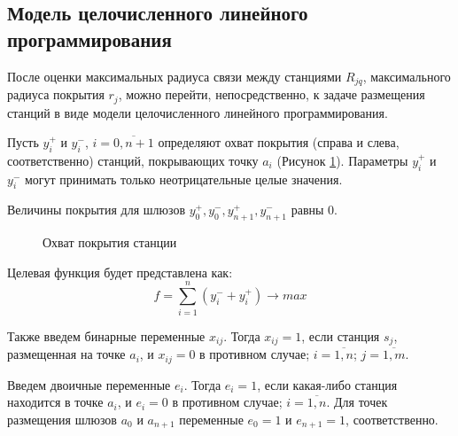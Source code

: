 


\subsection{Модель целочисленного линейного программирования}

После оценки максимальных радиуса связи между станциями $R_{jq}$, максимального радиуса покрытия $r_j$, можно перейти, непосредственно, к задаче размещения станций в виде модели целочисленного линейного программирования.

Пусть $y_i^+$ и $y_i^-$, $i= \overline{0,n+1}$ определяют охват покрытия (справа и слева, соответственно) станций, покрывающих точку $a_i$ (Рисунок \cref{fig:part3_station_coverage}). Параметры $y_i^+$ и $y_i^-$ могут принимать только неотрицательные целые значения.

Величины  покрытия для шлюзов $y_0^+, y_0^-, y_{n+1}^+, y_{n+1}^-$ равны 0.

\begin{figure}[ht]
  \caption{Охват покрытия станции}\label{fig:part3_station_coverage}
\end{figure}
 
Целевая функция будет представлена как:
\begin{equation}
  \label{eq:part3_objective_function}
  f =  \sum\limits_{i=1}^n (y_i^- + y_i^+) \rightarrow max
\end{equation}

Также введем бинарные переменные $x_{ij}$. Тогда $x_{ij}=1$, если станция $s_j$, размещенная на точке $a_i$, и $x_{ij}=0$ в противном случае; $i= \overline{1, n}$; $j = \overline{1,m}$.

Введем двоичные переменные $ e_i $. Тогда $ e_i = 1 $, если какая-либо станция находится в точке $ a_i $, и $ e_i = 0$  в противном случае; $ i = \overline {1, n} $. Для точек размещения шлюзов $ a_0 $ и $a_{n + 1}$ переменные $ e_0 = 1 $ и $ e_{n + 1} =1 $, соответственно. 

